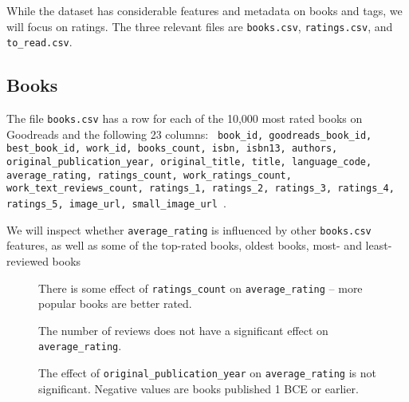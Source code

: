 \documentclass[11pt]{article}
\begin{document}
   While the dataset has considerable features and metadata on books and tags, we will focus on ratings. The three relevant files are \texttt{books.csv}, \texttt{ratings.csv}, and \texttt{to\_read.csv}.
   
    \hypertarget{books}{%
\subsection{Books}\label{books}}



The file \texttt{books.csv} has a row for each of the 10,000 most rated books on Goodreads and the following 23 columns:
\texttt{
book\_id,
goodreads\_book\_id,
best\_book\_id,
work\_id,          
books\_count,  
isbn,                 
isbn13,             
authors,            
original\_publication\_year,
original\_title,               
title,                        
language\_code,    
average\_rating,     
ratings\_count,       
work\_ratings\_count,
work\_text\_reviews\_count,
ratings\_1,
ratings\_2,
ratings\_3,
ratings\_4,
ratings\_5,
image\_url,
small\_image\_url
}.

We will inspect whether \texttt{average\_rating} is influenced by
other \texttt{books.csv} features, as well as some of the top-rated books, oldest books, most- and least-reviewed books
        
    
\begin{figure}
   \begin{center}
    \end{center}
\caption[Average Rating by Ratings Count]{There is some effect of \texttt{ratings\_count} on
\texttt{average\_rating} -- more popular books are better rated.
     \label{fig:average-rating-ratings-count}
}
\end{figure}    
    
    

\begin{figure}
    \begin{center}
    \end{center}
\caption[Average Rating by Reviews Count]{The number of reviews does not have a significant effect on
\texttt{average\_rating}.}
     \label{fig:average-rating-reviews-count}
\end{figure}


\begin{figure}
    \begin{center}
    \end{center}
    \caption[Average Rating by Publication Year]{The effect of \texttt{original\_publication\_year} on
\texttt{average\_rating} is not significant. Negative values are
books published 1 BCE or earlier.}
     \label{fig:average-rating-reviews-count}
\end{figure}
    
\end{document}
